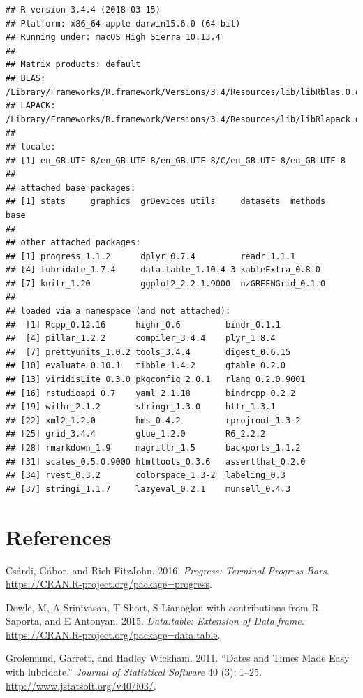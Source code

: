 \documentclass[]{article}
\begin{document}
\begin{verbatim}
## R version 3.4.4 (2018-03-15)
## Platform: x86_64-apple-darwin15.6.0 (64-bit)
## Running under: macOS High Sierra 10.13.4
## 
## Matrix products: default
## BLAS: /Library/Frameworks/R.framework/Versions/3.4/Resources/lib/libRblas.0.dylib
## LAPACK: /Library/Frameworks/R.framework/Versions/3.4/Resources/lib/libRlapack.dylib
## 
## locale:
## [1] en_GB.UTF-8/en_GB.UTF-8/en_GB.UTF-8/C/en_GB.UTF-8/en_GB.UTF-8
## 
## attached base packages:
## [1] stats     graphics  grDevices utils     datasets  methods   base     
## 
## other attached packages:
## [1] progress_1.1.2      dplyr_0.7.4         readr_1.1.1        
## [4] lubridate_1.7.4     data.table_1.10.4-3 kableExtra_0.8.0   
## [7] knitr_1.20          ggplot2_2.2.1.9000  nzGREENGrid_0.1.0  
## 
## loaded via a namespace (and not attached):
##  [1] Rcpp_0.12.16      highr_0.6         bindr_0.1.1      
##  [4] pillar_1.2.2      compiler_3.4.4    plyr_1.8.4       
##  [7] prettyunits_1.0.2 tools_3.4.4       digest_0.6.15    
## [10] evaluate_0.10.1   tibble_1.4.2      gtable_0.2.0     
## [13] viridisLite_0.3.0 pkgconfig_2.0.1   rlang_0.2.0.9001 
## [16] rstudioapi_0.7    yaml_2.1.18       bindrcpp_0.2.2   
## [19] withr_2.1.2       stringr_1.3.0     httr_1.3.1       
## [22] xml2_1.2.0        hms_0.4.2         rprojroot_1.3-2  
## [25] grid_3.4.4        glue_1.2.0        R6_2.2.2         
## [28] rmarkdown_1.9     magrittr_1.5      backports_1.1.2  
## [31] scales_0.5.0.9000 htmltools_0.3.6   assertthat_0.2.0 
## [34] rvest_0.3.2       colorspace_1.3-2  labeling_0.3     
## [37] stringi_1.1.7     lazyeval_0.2.1    munsell_0.4.3
\end{verbatim}

\section*{References}\label{references}

\hypertarget{refs}{}
\hypertarget{ref-progress}{}
Csárdi, Gábor, and Rich FitzJohn. 2016. \emph{Progress: Terminal
Progress Bars}. \url{https://CRAN.R-project.org/package=progress}.

\hypertarget{ref-data.table}{}
Dowle, M, A Srinivasan, T Short, S Lianoglou with contributions from R
Saporta, and E Antonyan. 2015. \emph{Data.table: Extension of
Data.frame}. \url{https://CRAN.R-project.org/package=data.table}.

\hypertarget{ref-lubridate}{}
Grolemund, Garrett, and Hadley Wickham. 2011. ``Dates and Times Made
Easy with lubridate.'' \emph{Journal of Statistical Software} 40 (3):
1--25. \url{http://www.jstatsoft.org/v40/i03/}.
\end{document}
